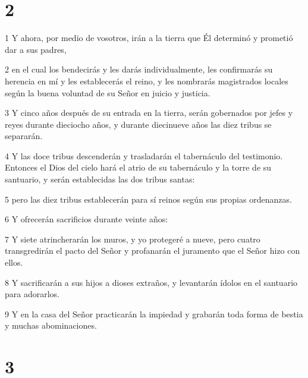 \chapter{2}

\par 1 Y ahora, por medio de vosotros, irán a la tierra que Él determinó y prometió dar a sus padres,
\par 2 en el cual los bendecirás y les darás individualmente, les confirmarás su herencia en mí y les establecerás el reino, y les nombrarás magistrados locales según la buena voluntad de su Señor en juicio y justicia.
\par 3 Y cinco años después de su entrada en la tierra, serán gobernados por jefes y reyes durante dieciocho años, y durante diecinueve años las diez tribus se separarán.
\par 4 Y las doce tribus descenderán y trasladarán el tabernáculo del testimonio. Entonces el Dios del cielo hará el atrio de su tabernáculo y la torre de su santuario, y serán establecidas las dos tribus santas:
\par 5 pero las diez tribus establecerán para sí reinos según sus propias ordenanzas.
\par 6 Y ofrecerán sacrificios durante veinte años:
\par 7 Y siete atrincherarán los muros, y yo protegeré a nueve, pero cuatro transgredirán el pacto del Señor y profanarán el juramento que el Señor hizo con ellos.
\par 8 Y sacrificarán a sus hijos a dioses extraños, y levantarán ídolos en el santuario para adorarlos.
\par 9 Y en la casa del Señor practicarán la impiedad y grabarán toda forma de bestia y muchas abominaciones.

\chapter{3}

